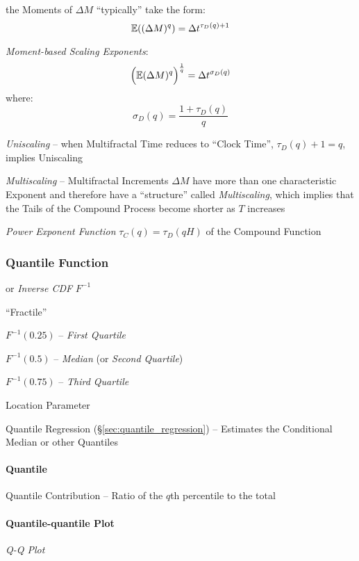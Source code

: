 the Moments of $\Delta M$ ``typically'' take the form:
\[
  \mathbb{E}((\Delta M)^q) = \Delta t^{\tau_D(q) + 1}
\]

\emph{Moment-based Scaling Exponents}:
\[
  \Big(\mathbb{E}(\Delta M)^q\Big)^\frac{1}{q} = \Delta t^{\sigma_D(q)}
\]
where:
\[
  \sigma_D(q) = \frac{1 + \tau_D(q)}{q}
\]

\emph{Uniscaling} -- when Multifractal Time reduces to ``Clock Time'',
$\tau_D(q) + 1 = q$, implies Uniscaling

\emph{Multiscaling} -- Multifractal Increments $\Delta M$ have more than one
characteristic Exponent and therefore have a ``structure'' called
\emph{Multiscaling}, which implies that the Tails of the Compound Process become
shorter as $T$ increases

\emph{Power Exponent Function} $\tau_C(q) = \tau_D(qH)$ of the Compound Function



\subsubsection{Quantile Function}\label{sec:quantile_function}

or \emph{Inverse CDF} $F^{-1}$

``Fractile''

$F^{-1}(0.25)$ -- \emph{First Quartile}

$F^{-1}(0.5)$ -- \emph{Median} (or \emph{Second Quartile})

$F^{-1}(0.75)$ -- \emph{Third Quartile}

Location Parameter

Quantile Regression (\S\ref{sec:quantile_regression}) -- Estimates the
Conditional Median or other Quantiles



\paragraph{Quantile}\label{sec:quantile}\hfill

Quantile Contribution -- Ratio of the $q$th percentile to the total



\paragraph{Quantile-quantile Plot}\label{sec:qq_plot}\hfill

\emph{Q-Q Plot}



